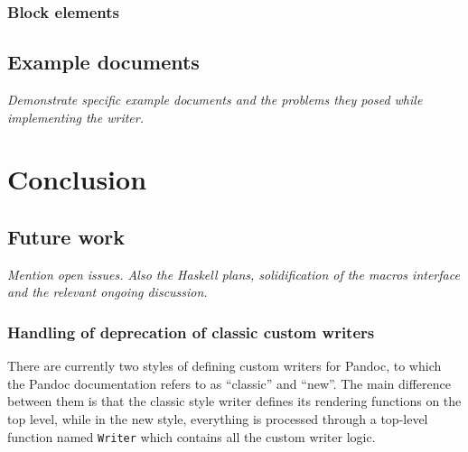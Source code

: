 \documentclass[
  digital,     %
  oneside,     %
  nosansbold,  %
  nocolorbold, %
  lof,         %
  lot,         %
]{fithesis4}
\begin{document}
\subsection{Block elements}

\section{Example documents}
\emph{Demonstrate specific example documents and the problems they posed while implementing the writer. \label{fig:html-browsers-typeset} }

% 


\chapter{Conclusion}
\section{Future work}
\emph{Mention open issues. Also the Haskell plans, solidification of the macros interface and the relevant ongoing discussion.}

\subsection{Handling of deprecation of classic custom writers}

There are currently two styles of defining custom writers for Pandoc, to which the Pandoc documentation refers to as ``classic'' and ``new''. The main difference between them is that the classic style writer defines its rendering functions on the top level, while in the new style, everything is processed through a top-level function named \texttt{Writer} which contains all the custom writer logic.
\end{document}
